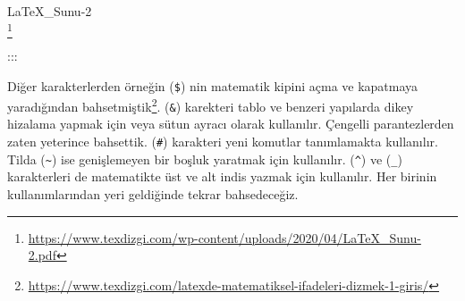 \documentclass[
  10pt,
]{scrbook}
\renewcommand{\href}[2]{#2\footnote{\url{#1}}}
\begin{document}
\href{https://www.texdizgi.com/wp-content/uploads/2020/04/LaTeX_Sunu-2.pdf}{LaTeX\_Sunu-2\\
}

:::

Diğer karakterlerden örneğin (\texttt{\$}) nin matematik kipini açma ve
kapatmaya yaradığından
\href{https://www.texdizgi.com/latexde-matematiksel-ifadeleri-dizmek-1-giris/}{bahsetmiştik}. (\texttt{\&}) karekteri tablo ve benzeri yapılarda dikey
hizalama yapmak için veya sütun ayracı olarak kullanılır. Çengelli
parantezlerden zaten yeterince bahsettik. (\texttt{\#}) karakteri yeni komutlar
tanımlamakta kullanılır. Tilda (\texttt{\textasciitilde{}}) ise genişlemeyen bir boşluk
yaratmak için kullanılır. (\texttt{\^{}}) ve (\texttt{\_}) karakterleri de matematikte üst
ve alt indis yazmak için kullanılır. Her birinin kullanımlarından yeri
geldiğinde tekrar bahsedeceğiz.

\backmatter

  

\printindex
\end{document}
